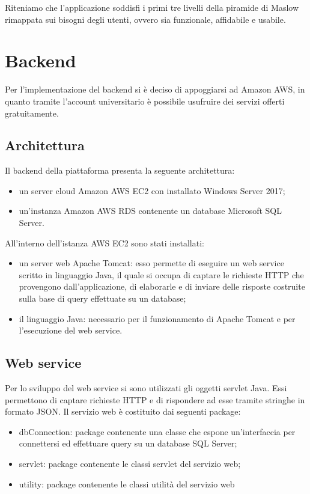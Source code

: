 \documentclass[12pt, a4paper, titlepage]{report}
\begin{document}
	Riteniamo che l'applicazione soddisfi i primi tre livelli della piramide di Maslow rimappata sui bisogni degli utenti, ovvero sia funzionale, affidabile e usabile.
	
	\section{Backend}
	Per l'implementazione del backend si è deciso di appoggiarsi ad Amazon AWS, in quanto tramite l'account universitario è possibile usufruire dei servizi offerti gratuitamente.
	\subsection{Architettura}
	Il backend della piattaforma presenta la seguente architettura:
	\begin{itemize}
		\item un server cloud Amazon AWS EC2 con installato Windows Server 2017;
		\item un'instanza Amazon AWS RDS contenente un database Microsoft SQL Server.
	\end{itemize}

	All'interno dell'istanza AWS EC2 sono stati installati:
	\begin{itemize}
		\item un server web Apache Tomcat: esso permette di eseguire un web service scritto in linguaggio Java, il quale si occupa di captare le richieste HTTP che provengono dall'applicazione, di elaborarle e di inviare delle risposte costruite sulla base di query effettuate su un database;
		\item il linguaggio Java: necessario per il funzionamento di Apache Tomcat e per l'esecuzione del web service.
	\end{itemize}

	\subsection{Web service}
	
	Per lo sviluppo del web service si sono utilizzati gli oggetti servlet Java. Essi permettono di captare richieste HTTP e di rispondere ad esse tramite stringhe in formato JSON. Il servizio web è costituito dai seguenti package:
	\begin{itemize}
		\item dbConnection: package contenente una classe che espone un'interfaccia per connettersi ed effettuare query su un database SQL Server;
		\item servlet: package contenente le classi servlet del servizio web;
		\item utility: package contenente le classi utilità del servizio web
	\end{itemize}
\end{document}
